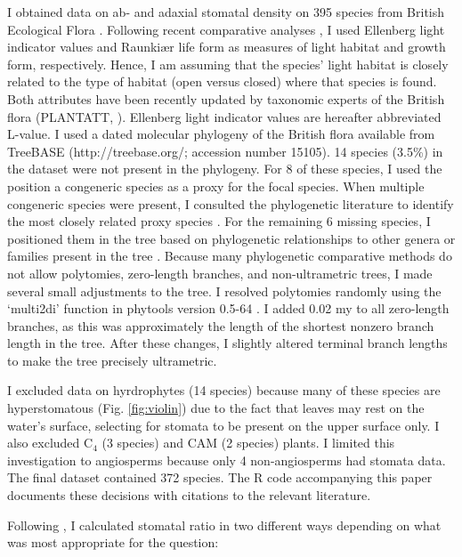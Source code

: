\documentclass[12pt, oneside]{article}
\newcommand{\pkg}[1]{{\fontseries{b}\selectfont #1}}
\newcommand{\el}{L-value}
\begin{document}
I obtained data on ab- and adaxial stomatal density on 395 species from British Ecological Flora \citep{Salisbury_1927, Fitter_Peat_1994a, BEF}. Following recent comparative analyses \citep[e.g.][]{Bartelheimer_Poschlod_2016, Salguero-Gomez_etal_2016}, I used Ellenberg light indicator values \citep{Ellenberg_1974} and Raunki\ae r life form \citep{Raunkiaer_1934} as measures of light habitat and growth form, respectively. Hence, I am assuming that the species' light habitat is closely related to the type of habitat (open versus closed) where that species is found. Both attributes have been recently updated by taxonomic experts of the British flora (PLANTATT, \cite{Hill_etal_2004}). Ellenberg light indicator values are hereafter abbreviated \el. I used a dated molecular phylogeny of the British flora \citep{Lim_etal_2014} available from TreeBASE (http://treebase.org/; accession number 15105). 14 species (3.5\%) in the dataset were not present in the phylogeny. For 8 of these species, I used the position a congeneric species as a proxy for the focal species. When multiple congeneric species were present, I consulted the phylogenetic literature to identify the most closely related proxy species \citep{Scheen_etal_2004, Salmaki_etal_2013}. For the remaining 6 missing species, I positioned them in the tree based on phylogenetic relationships to other genera or families present in the tree \citep{Fior_etal_2006}. Because many phylogenetic comparative methods do not allow polytomies, zero-length branches, and non-ultrametric trees, I made several small adjustments to the tree. I resolved polytomies randomly using the `multi2di' function in \pkg{phytools} version 0.5-64 \citep{Revell_2012}. I added 0.02 my to all zero-length branches, as this was approximately the length of the shortest nonzero branch length in the tree. After these changes, I slightly altered terminal branch lengths to make the tree precisely ultrametric.

I excluded data on hyrdrophytes (14 species) because many of these species are hyperstomatous (Fig. \ref{fig:violin}) due to the fact that leaves may rest on the water's surface, selecting for stomata to be present on the upper surface only. I also excluded C$_4$ (3 species) and CAM (2 species) plants. I limited this investigation to angiosperms because only 4 non-angiosperms had stomata data. The final dataset contained 372 species. The R code accompanying this paper documents these decisions with citations to the relevant literature.

Following \cite{Muir_2015}, I calculated stomatal ratio in two different ways depending on what was most appropriate for the question: 
\end{document}
